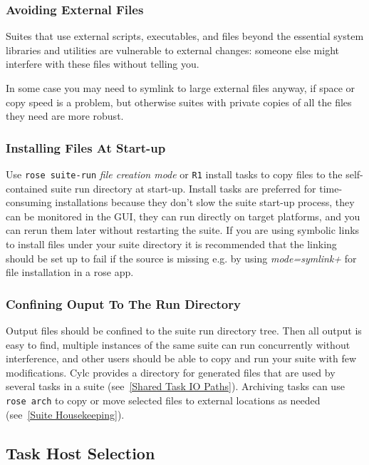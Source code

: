 \subsubsection{Avoiding External Files}

Suites that use external scripts, executables, and files beyond the essential
system libraries and utilities are vulnerable to external changes: someone
else might interfere with these files without telling you.

In some case you may need to symlink to large external files anyway, if space
or copy speed is a problem, but otherwise suites with private copies of all the
files they need are more robust.

\subsubsection{Installing Files At Start-up}

Use \lstinline=rose suite-run= {\em file creation mode} or \lstinline=R1=
install tasks to copy files to the self-contained suite run directory at
start-up.  Install tasks are preferred for time-consuming installations because
they don't slow the suite start-up process, they can be monitored in the GUI,
they can run directly on target platforms, and you can rerun them later without
restarting the suite. If you are using symbolic links to install files under
your suite directory it is recommended that the linking should be set up to
fail if the source is missing e.g. by using {\em mode=symlink+} for file
installation in a rose app.

\subsubsection{Confining Ouput To The Run Directory}

Output files should be confined to the suite run directory tree. Then all
output is easy to find, multiple instances of the same suite can run
concurrently without interference, and other users should be able to copy and
run your suite with few modifications. Cylc provides a \lstinline@share@
directory for generated files that are used by several tasks in a suite
(see~\ref{Shared Task IO Paths}). Archiving tasks can use \lstinline=rose arch=
to copy or move selected files to external locations as needed (see~\ref{Suite
Housekeeping}).

\subsection{Task Host Selection}

